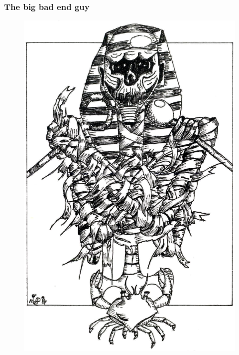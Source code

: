 \documentclass[a4paper]{module}
\begin{document}
\subsubsection{The big bad end guy}

\begin{figure}[h]
\includegraphics[width=\columnwidth]{module_art_interior.png}
\end{figure}

\end{document}
